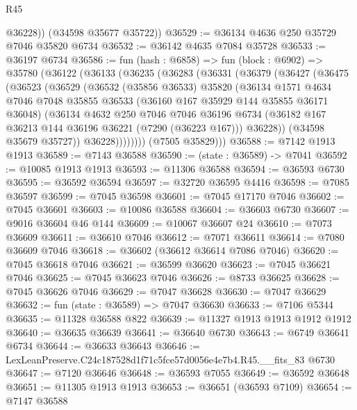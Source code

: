 \begin{lexlean}{R45}
\begin{coremodule}
{          @36228))
      (@34598 @35677 @35722))
@36529 := @36134 @4636 @250 @35729 @7046 @35820 @6734
@36532 := @36142 @4635 @7084 @35728
@36533 := @36197 @6734
@36586 := fun (hash : @6858) =>
  fun (block : @6902) =>
  @35780
    (@36122
      (@36133
        (@36235
          (@36283
            (@36331
              (@36379
                (@36427
                  (@36475
                    (@36523
                      (@36529
                        (@36532
                          (@35856 @36533)
                          @35820
                          (@36134
                            @1571
                            @4634
                            @7046
                            @7048
                            @35855
                            @36533
                            (@36160 @167 @35929 @144 @35855 @36171 @36048)
                            (@36134
                              @4632
                              @250
                              @7046
                              @7046
                              @36196
                              @6734
                              (@36182 @167 @36213 @144 @36196 @36221 (@7290 (@36223 @167)))
                              @36228))
                          (@34598 @35679 @35727))
                        @36228))))))))
        (@7505 @35829)))
@36588 := @7142 @1913 @1913
@36589 := @7143 @36588
@36590 := (state : @36589) -> @7041
@36592 := @10085 @1913 @1913
@36593 := @11306 @36588
@36594 := @36593 @6730
@36595 := @36592 @36594
@36597 := @32720 @36595 @4416
@36598 := @7085 @36597
@36599 := @7045 @36598
@36601 := @7045 @17170 @7046
@36602 := @7045 @36601
@36603 := @10086 @36588
@36604 := @36603 @6730
@36607 := @9016 @36604 @46 @144
@36609 := @10067 @36607 @24
@36610 := @7073 @36609
@36611 := @36610 @7046
@36612 := @7071 @36611
@36614 := @7080 @36609 @7046
@36618 := @36602 (@36612 @36614 @7086 @7046)
@36620 := @7045 @36618 @7046
@36621 := @36599 @36620
@36623 := @7045 @36621 @7046
@36625 := @7045 @36623 @7046
@36626 := @8733 @36625
@36628 := @7045 @36626 @7046
@36629 := @7047 @36628
@36630 := @7047 @36629
@36632 := fun (state : @36589) => @7047 @36630
@36633 := @7106 @5344
@36635 := @11328 @36588 @822
@36639 := @11327 @1913 @1913 @1912 @1912
@36640 := @36635 @36639
@36641 := @36640 @6730
@36643 := @6749 @36641 @6734
@36644 := @36633 @36643
@36646 := LexLeanPreserve.C24c187528d1f71c5fce57d0056e4e7b4.R45.__fits_83 @6730
@36647 := @7120 @36646
@36648 := @36593 @7055
@36649 := @36592 @36648
@36651 := @11305 @1913 @1913
@36653 := @36651 (@36593 @7109)
@36654 := @7147 @36588
}
\end{coremodule}
\end{lexlean}

